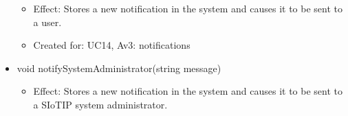 \begin{description}
\begin{itemize}[noitemsep,nolistsep,leftmargin=-.25cm]
\begin{itemize}[noitemsep,nolistsep]
           \item Effect: Stores a new notification in the system and causes it to be sent to a user.
\item Created for: UC14, Av3: notifications
        \end{itemize}
      \item \textsf{void notifySystemAdministrator(string message)}
        \begin{itemize}[noitemsep,nolistsep]
           \item Effect: Stores a new notification in the system and causes it to be sent to a SIoTIP system administrator.
        \end{itemize}
    \end{itemize}
    \end{description}

